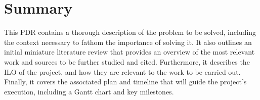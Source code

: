 \chapter{Summary}
This \acf{PDR} contains a thorough description of the problem to be solved, including the context necessary to fathom the importance of solving it.
It also outlines an initial miniature literature review that provides an overview of the most relevant work and sources to be further studied and cited.
Furthermore, it describes the \acf{ILO} of the project, and how they are relevant to the work to be carried out.
Finally, it covers the associated plan and timeline that will guide the project's execution, including a Gantt chart and key milestones.
